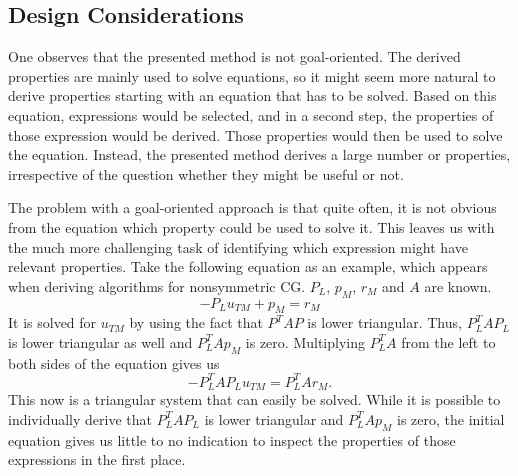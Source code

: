 \begin{description}
\end{description}


\subsection{Design Considerations}

One observes that the presented method is not goal-oriented. The derived properties are mainly used to solve equations, so it might seem more natural to derive properties starting with an equation that has to be solved. Based on this equation, expressions would be selected, and in a second step, the properties of those expression would be derived. Those properties would then be used to solve the equation. Instead, the presented method derives a large number or properties, irrespective of the question whether they might be useful or not.

The problem with a goal-oriented approach is that quite often, it is not obvious from the equation which property could be used to solve it. This leaves us with the much more challenging task of identifying which expression might have relevant properties. Take the following equation as an example, which appears when deriving algorithms for nonsymmetric CG. $P_L$, $p_M$, $r_M$ and $A$ are known.
%
$$-P_L u_{TM} + p_M = r_M$$
%
It is solved for $u_{TM}$ by using the fact that $P^T A P$ is lower triangular. Thus, $P_L^T A P_L$ is lower triangular as well and $P_L^T A p_M$ is zero. Multiplying $P_L^T A$ from the left to both sides of the equation gives us
%
$$-P_L^T A P_L u_{TM} = P_L^T A r_M \text{.}$$
%
This now is a triangular system that can easily be solved. While it is possible to individually derive that $P_L^T A P_L$ is lower triangular and $P_L^T A p_M$ is zero, the initial equation gives us little to no indication to inspect the properties of those expressions in the first place.


